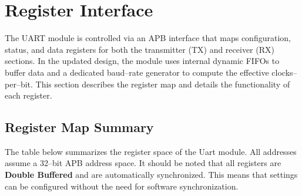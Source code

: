 \section{Register Interface}

The UART module is controlled via an APB interface that maps configuration, status, and data registers for both the transmitter (TX) and receiver (RX) sections. In the updated design, the module uses internal dynamic FIFOs to buffer data and a dedicated baud–rate generator to compute the effective clocks–per–bit. This section describes the register map and details the functionality of each register.

\subsection{Register Map Summary}

The table below summarizes the register space of the Uart module. All addresses assume a 32–bit APB address space.
It should be noted that all registers are \textbf{Double Buffered} and are automatically synchronized. This means that settings can be configured without the need for software synchronization.

